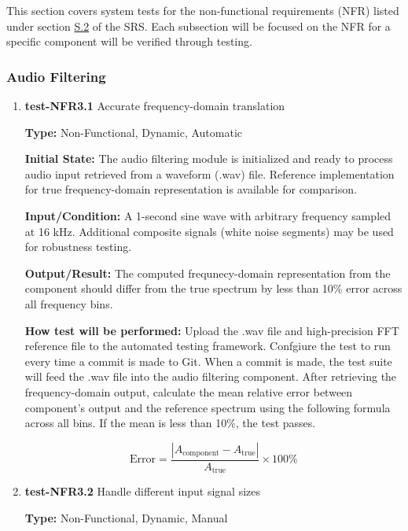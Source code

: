 \documentclass[12pt, titlepage]{article}
\begin{document}
This section covers system tests for the non-functional requirements (NFR) 
listed under section \hyperref[SRS-sec:S.2]{S.2} of the SRS. Each subsection 
will be focused on the NFR for a specific component will be verified through 
testing.

\subsubsection{Audio Filtering}
		

\begin{enumerate}

\item{\textbf{test-NFR3.1} Accurate frequency-domain translation\\}

\textbf{Type:} Non-Functional, Dynamic, Automatic
					
\textbf{Initial State:} 
The audio filtering module is initialized and ready to process audio input 
retrieved from a waveform (.wav) file. Reference implementation for true 
frequency-domain representation is available for comparison. 
					
\textbf{Input/Condition:} 
A 1-second sine wave with arbitrary frequency sampled at 16 kHz. Additional 
composite signals (white noise segments) may be used for robustness testing. 
					
\textbf{Output/Result:} 
The computed frequnecy-domain representation from the component should differ 
from the true spectrum by less than 10\% error across all frequency bins. 
					
\textbf{How test will be performed:} 
Upload the .wav file and high-precision FFT reference file to the automated 
testing framework. Confgiure the test to run every time a commit is made to 
Git. When a commit is made, the test suite will feed the .wav file into the 
audio filtering component. After retrieving the frequency-domain output, 
calculate the mean relative error between component's output and the reference 
spectrum using the following formula across all bins. If the mean is less than 
10\%, the test passes. 

\[
\text{Error} = \frac{\left|A_{\text{component}} - A_{\text{true}}\right|}{A_{\text{true}}} \times 100\%
\]
					
\item{\textbf{test-NFR3.2} Handle different input signal sizes\\}

\textbf{Type:} Non-Functional, Dynamic, Manual
					

\end{enumerate}
\end{document}
